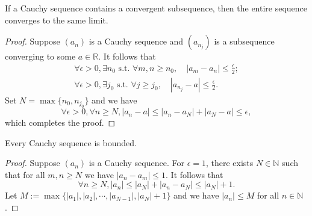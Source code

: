 \begin{lem}
  \label{lem:CauchySubseqConvergence}
  If a Cauchy sequence contains a convergent subsequence,
  then the entire sequence converges to the same limit.
\end{lem}
\begin{proof}
  Suppose $(a_n)$ is a Cauchy sequence
  and $(a_{n_j})$ is a subsequence converging to some $a\in \mathbb{R}$.
  It follows that
  \begin{displaymath}
    \begin{array}{l}
    \forall \epsilon>0, \exists n_0 \text{ s.t. }
    \forall m,n\ge n_0,\quad |a_m-a_n|\le \frac{\epsilon}{2};
    \\
    \forall \epsilon>0, \exists j_0 \text{ s.t. }
    \forall j\ge j_0,\quad |a_{n_j}-a|\le \frac{\epsilon}{2}.
    \end{array}
  \end{displaymath}
  Set $N=\max\{n_0, n_{j_0}\}$ and we have
  \begin{displaymath}
    \forall \epsilon>0, \forall n\ge N, 
    |a_{n}-a|\le |a_{n}-a_N|+ |a_{N}-a|
    \le \epsilon,
  \end{displaymath}
  which completes the proof.
\end{proof}

\begin{lem}
  \label{lem:CauchySeqIsBounded}
  Every Cauchy sequence is bounded.
\end{lem}
\begin{proof}
  Suppose $(a_{n})$ is a Cauchy sequence. For $\epsilon=1$,
  there exists $N\in \mathbb{N}$ such that for all $m,n\ge N$ we have
  $|a_{n}-a_{m}|\le 1$. It follows that
  \begin{displaymath}
    \forall n\ge N, |a_{n}|\le |a_{N}|+|a_{n}-a_{N}|\le |a_{N}|+1.
  \end{displaymath}
  Let $M:=\max\{|a_{1}|,|a_{2}|,\cdots,|a_{N-1}|,|a_{N}|+1\}$ and
  we have $|a_{n}|\le M$ for all $n\in \mathbb{N}$.
\end{proof}

